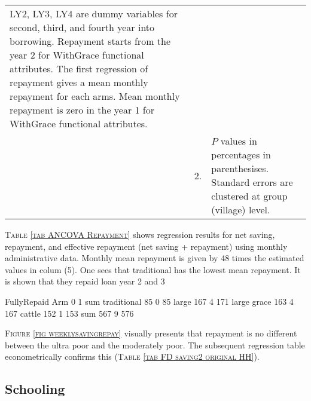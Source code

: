 \begin{minipage}[t]{14cm}
\begin{tabular}{>{\hfill\scriptsize}p{1cm}<{}>{\hfill\scriptsize}p{.25cm}<{}>{\scriptsize}p{12cm}<{\hfill}}
\textsf{LY2, LY3, LY4} are dummy variables for second, third, and fourth year into borrowing.  Repayment starts from the year 2 for \textsf{WithGrace} functional attributes. The first regression of repayment gives a mean monthly repayment for each arms. Mean monthly repayment is zero in the year 1 for \textsf{WithGrace} functional attributes.\\
& 2. & $P$ values in percentages in parenthesises. Standard errors are clustered at group (village) level.
\end{tabular}
\end{minipage}


\begin{palepinkleftbar}
\begin{finding}
\textsc{\small Table \ref{tab ANCOVA Repayment}} shows regression results for net saving, repayment, and effective repayment (net saving + repayment) using monthly administrative data. Monthly mean repayment is given by 48 times the estimated values in colum (5). One sees that \textsf{traditional} has the lowest mean repayment. It is shown that they repaid loan year 2 and 3 

\end{finding}
\end{palepinkleftbar}


\begin{Schunk}
\begin{Soutput}
             FullyRepaid
Arm             0   1 sum
  traditional  85   0  85
  large       167   4 171
  large grace 163   4 167
  cattle      152   1 153
  sum         567   9 576
\end{Soutput}
\end{Schunk}



\begin{palepinkleftbar}
\begin{finding}
\textsc{Figure \ref{fig weeklysavingrepay}} visually presents that repayment is no different between the ultra poor and the moderately poor. The subsequent regression table econometrically confirms this (\textsc{\normalsize Table \ref{tab FD saving2 original HH}}). 
\end{finding}
\end{palepinkleftbar}

\subsection{Schooling}

